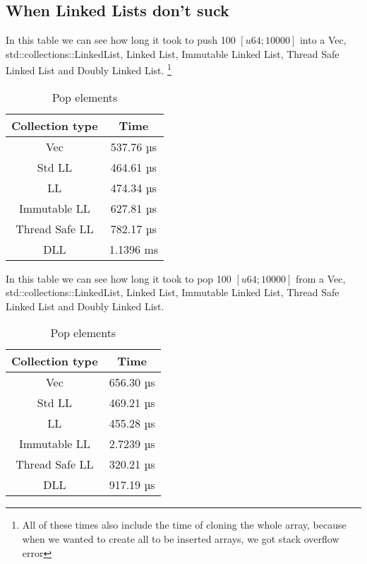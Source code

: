 \documentclass[11pt,twoside,a4paper]{article}
\begin{document}
\subsection*{When Linked Lists don't suck}

In this table we can see how long it took to push 100 $[u64; 10000]$ into a Vec,\\
std::collections::LinkedList, Linked List, Immutable Linked List, Thread Safe
Linked List and Doubly Linked List.
\footnote{All of these times also include the time of cloning the whole array, because
      when we wanted to create all to be inserted arrays, we got stack overflow error}
\begin{table}[!h]
      \begin{center}
            \caption{Pop elements}
            \begin{tabular}{|c|c|}
                  \hline
                  Collection type & Time      \\
                  \hline
                  Vec             & 537.76 µs \\
                  Std LL          & 464.61 µs \\
                  LL              & 474.34 µs \\
                  Immutable LL    & 627.81 µs \\
                  Thread Safe LL  & 782.17 µs \\
                  DLL             & 1.1396 ms \\
                  \hline
            \end{tabular}
      \end{center}
\end{table}

In this table we can see how long it took to pop 100 $[u64; 10000]$ from a Vec,\\
std::collections::LinkedList, Linked List, Immutable Linked List, Thread Safe
Linked List and Doubly Linked List.
\begin{table}[!h]
      \begin{center}
            \caption{Pop elements}
            \begin{tabular}{|c|c|}
                  \hline
                  Collection type & Time      \\
                  \hline
                  Vec             & 656.30 µs \\
                  Std LL          & 469.21 µs \\
                  LL              & 455.28 µs \\
                  Immutable LL    & 2.7239 µs \\
                  Thread Safe LL  & 320.21 µs \\
                  DLL             & 917.19 µs \\
                  \hline
            \end{tabular}
      \end{center}
\end{table}
\end{document}

